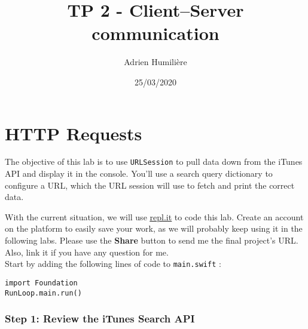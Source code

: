 \documentclass[a4paper,11pt]{scrartcl}
\begin{document}
\newcommand{\mytitle}{\textsf{\textbf{TP 2 - Client–Server communication}}}
\title{\mytitle}
\author{Adrien Humilière}
\date{25/03/2020}

\maketitle

\part{HTTP Requests}

The objective of this lab is to use \texttt{URLSession} to pull data down from the iTunes API and display it in the console. You'll use a search query dictionary to configure a URL, which the URL session will use to fetch and print the correct data.

With the current situation, we will use \href{https://repl.it/languages/swift}{\underline{repl.it}} to code this lab. Create an account on the platform to easily save your work, as we will probably keep using it in the following labs. Please use the \textbf{Share} button to send me the final project's URL. Also, link it if you have any question for me.\\

Start by adding the following lines of code to \texttt{main.swift} :
\begin{lstlisting}
import Foundation
RunLoop.main.run()
\end{lstlisting}

\section*{Step 1: Review the iTunes Search API}
\end{document}
